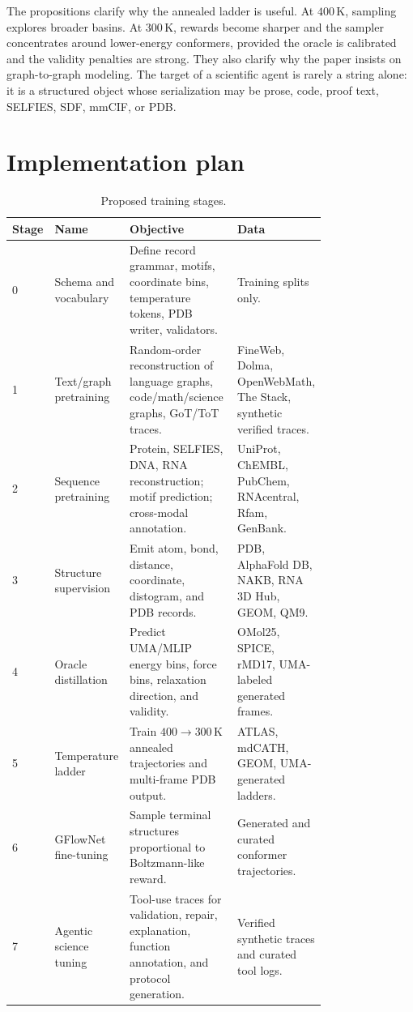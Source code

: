 \documentclass[11pt]{article}
\newcommand{\1}{\mathbf{1}}
\begin{document}
The propositions clarify why the annealed ladder is useful. At \(400\,\mathrm K\), sampling explores broader basins. At \(300\,\mathrm K\), rewards become sharper and the sampler concentrates around lower-energy conformers, provided the oracle is calibrated and the validity penalties are strong. They also clarify why the paper insists on graph-to-graph modeling. The target of a scientific agent is rarely a string alone: it is a structured object whose serialization may be prose, code, proof text, SELFIES, SDF, mmCIF, or PDB.

\section{Implementation plan}

{\scriptsize
\setlength{\tabcolsep}{3pt}
\begin{longtable}{p{0.06\linewidth}p{0.18\linewidth}p{0.37\linewidth}p{0.16\linewidth}}
\caption{Proposed training stages.}\\
\toprule
Stage & Name & Objective & Data \\
\midrule
\endhead
0 & Schema and vocabulary & Define record grammar, motifs, coordinate bins, temperature tokens, PDB writer, validators. & Training splits only. \\
1 & Text/graph pretraining & Random-order reconstruction of language graphs, code/math/science graphs, GoT/ToT traces. & FineWeb, Dolma, OpenWebMath, The Stack, synthetic verified traces. \\
2 & Sequence pretraining & Protein, SELFIES, DNA, RNA reconstruction; motif prediction; cross-modal annotation. & UniProt, ChEMBL, PubChem, RNAcentral, Rfam, GenBank. \\
3 & Structure supervision & Emit atom, bond, distance, coordinate, distogram, and PDB records. & PDB, AlphaFold DB, NAKB, RNA 3D Hub, GEOM, QM9. \\
4 & Oracle distillation & Predict UMA/MLIP energy bins, force bins, relaxation direction, and validity. & OMol25, SPICE, rMD17, UMA-labeled generated frames. \\
5 & Temperature ladder & Train $400\to300\,\mathrm K$ annealed trajectories and multi-frame PDB output. & ATLAS, mdCATH, GEOM, UMA-generated ladders. \\
6 & GFlowNet fine-tuning & Sample terminal structures proportional to Boltzmann-like reward. & Generated and curated conformer trajectories. \\
7 & Agentic science tuning & Tool-use traces for validation, repair, explanation, function annotation, and protocol generation. & Verified synthetic traces and curated tool logs. \\
\bottomrule
\end{longtable}}
\end{document}
